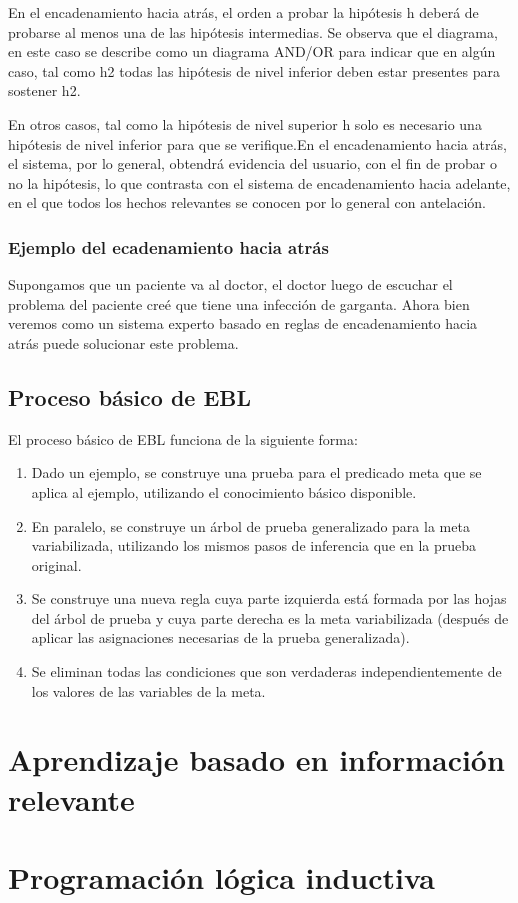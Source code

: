 \documentclass[12 pt, a4paper]{article}
\begin{document}
			En el encadenamiento hacia atrás, el orden a probar la hipótesis h deberá de probarse al menos una de las hipótesis intermedias. Se observa que el diagrama, en este caso se describe como un diagrama AND/OR para indicar que en algún caso, tal como h2 todas las hipótesis de nivel inferior deben estar presentes para sostener h2.
	
			En otros casos, tal como la hipótesis de nivel superior h solo es necesario una hipótesis de nivel inferior para que se verifique.En el encadenamiento hacia atrás, el sistema, por lo general, obtendrá evidencia del usuario, con el fin de probar o no la hipótesis, lo que contrasta con el sistema de encadenamiento hacia adelante, en el que todos los hechos relevantes se conocen por lo general con antelación.
			\subsubsection{Ejemplo del ecadenamiento hacia atrás}
			Supongamos que un paciente va al doctor, el doctor luego de escuchar el problema del paciente creé que tiene una infección de garganta. Ahora bien veremos como un sistema experto basado en reglas de encadenamiento hacia atrás puede solucionar este problema.
			
			\subsection{Proceso básico de EBL}
			El proceso básico de EBL funciona de la siguiente forma:
				\begin{enumerate}
						\item Dado un ejemplo, se construye una prueba para el predicado meta que se aplica al ejemplo, utilizando el conocimiento básico disponible.\\
						  \item En paralelo, se construye un árbol de prueba generalizado para la meta variabilizada, utilizando los mismos pasos de inferencia que en la prueba original.\\
						  \item Se construye una nueva regla cuya parte izquierda está formada por las hojas del árbol de prueba y cuya parte derecha es la meta variabilizada (después de aplicar las asignaciones necesarias de la prueba generalizada).\\
						  \item Se eliminan todas las condiciones que son verdaderas independientemente de los valores de las variables de la meta.\\
				\end{enumerate}

	 \section{Aprendizaje basado en información relevante}
	
	 \section{Programación lógica inductiva}
	 
\end{document}
